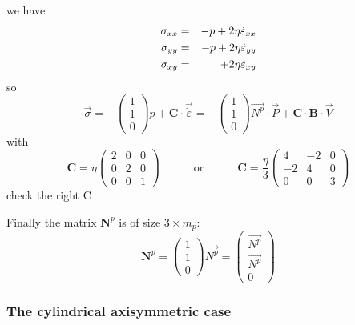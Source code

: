 we have 
\begin{eqnarray}
\sigma_{xx}&=&-p + 2\eta \dot\varepsilon_{xx} \\
\sigma_{yy}&=&-p + 2\eta \dot\varepsilon_{yy} \\
\sigma_{xy}&=& \hspace{5.5mm} + 2\eta \dot\varepsilon_{xy} 
\end{eqnarray}
so
\begin{equation}
\vec{\sigma} 
=-\left( 
\begin{array}{c}
1 \\ 1 \\ 0 
\end{array}
\right) p+ {\bm C} \cdot \vec{\dot\varepsilon}
=
- \left(
\begin{array}{c}
1 \\ 1 \\ 0 
\end{array}
\right)
\vec{N^p} \cdot {\vec P}  + 
{\bm C} \cdot  {\bm B}\cdot {\vec V}
\end{equation}
with
\begin{equation}
{\bm C}=
\eta
\left(
\begin{array}{ccc}
2 & 0 & 0 \\
0 & 2 & 0 \\
0 & 0 & 1  
\end{array}
\right)
\quad\quad\quad
\text{or}
\quad\quad\quad
{\bm C}=
\frac{\eta}{3}
\left(
\begin{array}{ccc}
4 & -2 & 0 \\
-2 & 4 & 0 \\
0 & 0 & 3  
\end{array}
\right)
\end{equation}
{\color{red} check the right C}

Finally the matrix ${\bm N}^p$ is of size $3\times m_p$:
\begin{equation}
{\bm N}^p=
\left(
\begin{array}{c}
1 \\ 1 \\ 0
\end{array}
\right)
\vec{N^p} 
=
\left(
\begin{array}{c}
\vec{N^p} \\
\vec{N^p} \\
0
\end{array}
\right)
\end{equation}


\subsubsection{The cylindrical axisymmetric case} \label{ss:cyl_axi}


